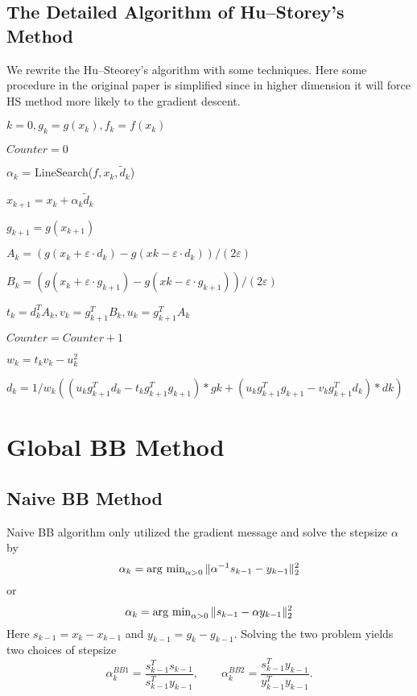 \documentclass{article}
\begin{document}
\subsection{The Detailed Algorithm of Hu--Storey's Method}
We rewrite the Hu--Steorey's algorithm with some techniques. Here some procedure in the original paper is simplified since in higher dimension it will force HS method more likely to the gradient descent.

\begin{algorithm}
	$k=0, g_k = g(x_k), f_k = f(x_k)$
	
	$Counter = 0$
	
	{
	
			$\alpha_k$ = LineSearch($f, x_k, \tilde d_k$)
			
				$x_{k+1} = x_k + \alpha_k \tilde d_k$
				
	$g_{k+1} = g(x_{k+1})$
	
	$A_k = (g(x_k+\varepsilon\cdot d_k) - g(xk -\varepsilon\cdot d_k))/(2\varepsilon)$
	
	$B_k = (g(x_k+\varepsilon\cdot g_{k+1}) - g(xk -\varepsilon\cdot g_{k+1}))/(2\varepsilon)$
	
	$t_k = d_k^TA_k, v_k = g_{k+1}^TB_k, u_k = g_{k+1}^TA_k$
	
	  $Counter = Counter + 1$
	  
	  $w_k = t_kv_k-u_k^2$
	  
	$d_k = 1/w_k((u_kg_{k+1}^Td_k - t_kg_{k+1}^Tg_{k+1})*gk + (u_kg_{k+1}^Tg_{k+1} - v_kg_{k+1}^Td_k)*dk)$
	
}
\end{algorithm}
\section{Global BB Method}
\subsection{Naive BB Method}
Naive BB algorithm only utilized the gradient message and solve the stepsize $\alpha$ by 
$$\alpha_k = \operatorname{arg~min}_{\alpha>0} \|\alpha^{-1} s_{k-1} - y_{k-1}\|_2^2$$
or 
$$\alpha_k = \operatorname{arg~min}_{\alpha>0} \| s_{k-1} - \alpha y_{k-1}\|_2^2$$
Here $s_{k-1} = x_k - x_{k-1}$ and $y_{k-1} = g_k - g_{k-1}$.
Solving the two problem yields two choices of stepsize
$$\alpha_k^{BB1} = \frac{s_{k-1}^Ts_{k-1}}{s_{k-1}^Ty_{k-1}}, \qquad 
\alpha_k^{BB2} = \frac{s_{k-1}^Ty_{k-1}}{y_{k-1}^Ty_{k-1}}.$$
\end{document}
